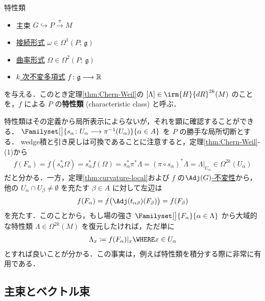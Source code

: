 \documentclass[TQFT_main]{subfiles}
\begin{document}
\begin{mydef}[label=def:characteristic-class-polynomial]{特性類}
    \begin{itemize}
        \item 主束 $G \hookrightarrow P \xrightarrow{\pi} M$
        \item \hyperref[def:connection]{接続形式} $\omega \in \Omega^1(P;\, \mathfrak{g})$
        \item \hyperref[def:curvature]{曲率形式} $\Omega \in \Omega^2(P;\, \mathfrak{g})$
        \item \hyperref[def:invariant]{$k$ 次不変多項式} $f \colon \mathfrak{g} \longrightarrow \mathbb{R}$
    \end{itemize}
    を与える．このとき定理\ref{thm:Chern-Weil}の $[\Lambda] \in \irm{H}{dR}^{2k} (M)$ のことを，$f$ による $P$ の\textbf{特性類} (characteristic class) と呼ぶ．
\end{mydef}

特性類はその定義から局所表示によらないが，それを顕に確認することができる．
$\Familyset[\big]{s_\alpha \colon U_\alpha \lto \pi^{-1}(U_\alpha)}{\alpha \in A}$ を $P$ の勝手な局所切断とする．
wedge積と引き戻しは可換であることに注意すると，定理\ref{thm:Chern-Weil}-(1)から
\begin{align}
    f(F_\alpha) = f(s_\alpha^* \Omega) = s_\alpha^* f(\Omega) = s_\alpha^*\pi^* \Lambda = (\pi \circ s_\alpha)^* \Lambda = \Lambda|_{U_\alpha} \in \Omega^{2k}(U_\alpha)
\end{align}
だと分かる．一方，定理\ref{thm:curvature-local}および $f$ の\hyperref[def:invariant]{$\Adj(G)$-不変性}から，他の $U_\alpha \cap U_\beta \neq \emptyset$ を充たす $\beta \in A$ に対して左辺は
\begin{align}
    f(F_\alpha) = f\bigl(\Adj(t_{\alpha\beta})(F_\beta)\bigr) = f(F_\beta)
\end{align}
を充たす．このことから，もし場の強さ $\Familyset[\big]{F_\alpha}{\alpha \in \Lambda}$ から大域的な特性類 $\Lambda \in \Omega^{2k}(M)$ を復元したければ，ただ単に
\begin{align}
    \Lambda_x \coloneqq f(F_\alpha)|_x \WHERE x \in U_\alpha
\end{align}
とすれば良いことが分かる．この事実は，例えば特性類を積分する際に非常に有用である．

\subsection{主束とベクトル束}
\end{document}
